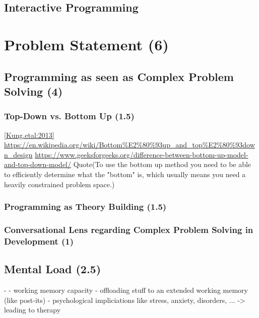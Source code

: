 \subsection{Interactive Programming}

\section{Problem Statement (6)}
\subsection{Programming as seen as Complex Problem Solving (4)}
\subsubsection{Top-Down vs. Bottom Up (1.5)}
\autoref{Kung.etal:2013}
\url{https://en.wikipedia.org/wiki/Bottom%E2%80%93up_and_top%E2%80%93down_design}
\url{https://www.geeksforgeeks.org/difference-between-bottom-up-model-and-top-down-model/}
Quote(To use the bottom up method you need to be able to efficiently determine what the "bottom" is, which usually means you need a heavily constrained problem space.)

\subsubsection{Programming as Theory Building (1.5)}
\subsubsection{Conversational Lens regarding Complex Problem Solving in Development (1)}

\subsection{Mental Load (2.5)}
- 
- working memory capacity
- offloading stuff to an extended working memory (like post-its)
- psychological impliciations like stress, anxiety, disorders, ... -> leading to therapy\addref


